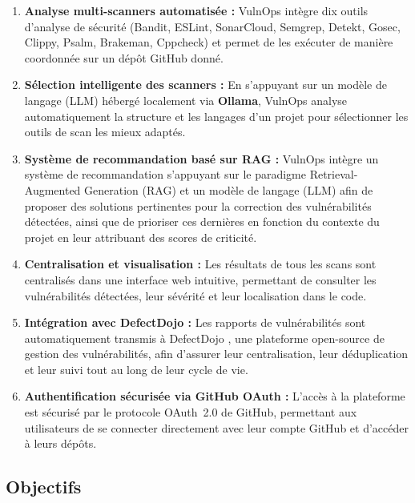 \documentclass[12pt, a4paper, oneside]{report}
\begin{document}
\begin{enumerate}
    \item \textbf{Analyse multi-scanners automatisée :} VulnOps intègre dix outils
    d'analyse de sécurité (Bandit, ESLint, SonarCloud, Semgrep, Detekt, Gosec,
    Clippy, Psalm, Brakeman, Cppcheck) et permet de les exécuter de manière
    coordonnée sur un dépôt GitHub donné.
    
    \item \textbf{Sélection intelligente des scanners :} En s'appuyant sur un
    modèle de langage (LLM) hébergé localement via \textbf{Ollama}, VulnOps analyse automatiquement
    la structure et les langages d'un projet pour sélectionner les outils de
    scan les mieux adaptés.
    
    \item \textbf{Système de recommandation basé sur RAG :} VulnOps intègre un système de recommandation
    s'appuyant sur le paradigme Retrieval-Augmented Generation (RAG) et un modèle de langage (LLM)
    afin de proposer des solutions pertinentes pour la correction des vulnérabilités détectées,
    ainsi que de prioriser ces dernières en fonction du contexte du projet en leur attribuant
    des scores de criticité.

    \item \textbf{Centralisation et visualisation :} Les résultats de tous les
    scans sont centralisés dans une interface web intuitive, permettant de consulter
    les vulnérabilités détectées, leur sévérité et leur localisation dans le code.
    
   \item \textbf{Intégration avec DefectDojo :} Les rapports de vulnérabilités
    sont automatiquement transmis à DefectDojo \cite{defectdojo}, une plateforme
    open-source de gestion des vulnérabilités, afin d’assurer leur centralisation,
    leur déduplication et leur suivi tout au long de leur cycle de vie. 
    
    \item \textbf{Authentification sécurisée via GitHub OAuth :} L'accès à la
    plateforme est sécurisé par le protocole OAuth~2.0 de GitHub, permettant aux
    utilisateurs de se connecter directement avec leur compte GitHub et d'accéder
    à leurs dépôts.
\end{enumerate}

\subsection{Objectifs}
\label{subsec:objectifs}
\end{document}
